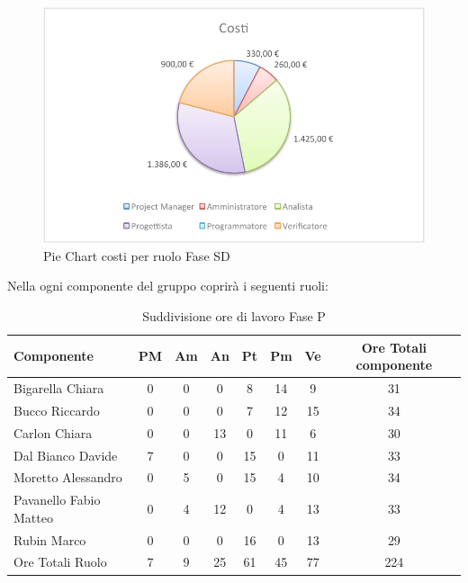 				\begin{figure}[H]\centering
					\includegraphics[width=\textwidth]{PianoDiProgetto/Pics/ChartTotCostiFaseSD.pdf}
					\caption{Pie Chart costi per ruolo Fase SD}
				\end{figure}
				Nella  ogni componente del gruppo \groupname{} coprirà i seguenti ruoli:
				\begin{table}[H]
					\begin{center}
						\begin{tabular}{| l | c | c | c | c | c | c | c |}
							\hline
							Componente 					& PM	& Am 	& An 	& Pt 		& Pm 		& Ve 	& Ore Totali componente \\ \hline
							
							Bigarella Chiara 			& 0		& 0		& 0		& 8 		& 14 		& 9 		& 31 \\
							Bucco Riccardo 				& 0		& 0		& 0		& 7 		& 12		& 15 		& 34 \\
							Carlon Chiara	 			& 0		& 0		& 13 	& 0			& 11 		& 6 		& 30 \\
							Dal Bianco Davide 			& 7 	& 0		& 0		& 15 		& 0			& 11 		& 33 \\
							Moretto Alessandro 			& 0		& 5 	& 0		& 15 		& 4 		& 10 		& 34 \\
							Pavanello Fabio Matteo	 	& 0		& 4		& 12 	& 0			& 4 		& 13 		& 33 \\
							Rubin Marco					& 0		& 0 	& 0		& 16 		& 0			& 13 		& 29 \\ \hline \hline
							
							Ore Totali Ruolo 			& 7 	& 9 	& 25 	& 61 		& 45 		& 77 		& 224	\\ \hline
						\end{tabular}
					\end{center}
					\caption{Suddivisione ore di lavoro Fase P}
				\end{table}
